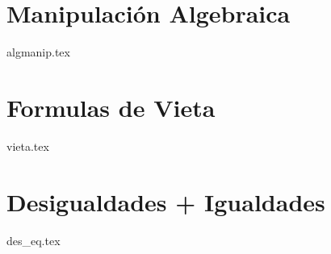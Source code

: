 \chapter{Manipulaci\'on Algebraica}
{algmanip.tex}

\chapter{Formulas de Vieta}
{vieta.tex}

\chapter{Desigualdades + Igualdades}
{des_eq.tex}